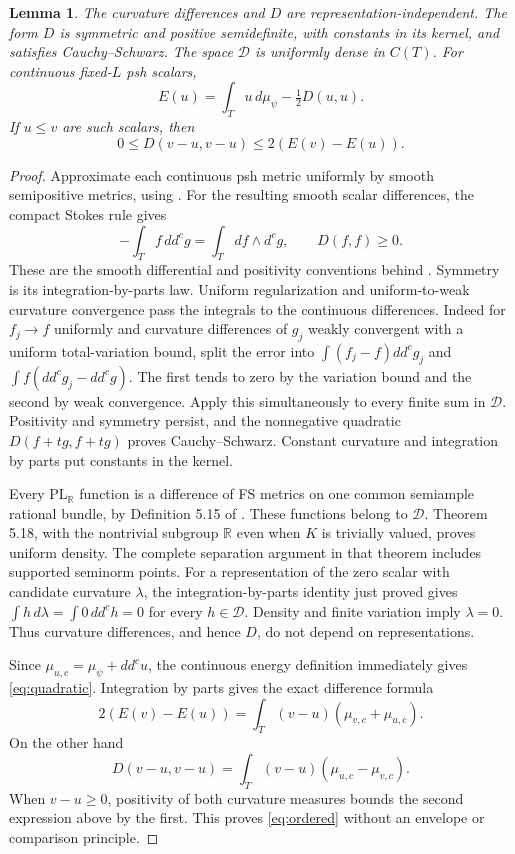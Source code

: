 \documentclass[11pt]{article}
\newtheorem{lemma}[theorem]{Lemma}
\newcommand{\ddc}{dd^c}
\newcommand{\DF}{\mathcal D}
\begin{document}
\begin{lemma}\label{lem:dirichlet}
The curvature differences and $D$ are representation-independent.
The form $D$ is symmetric and positive semidefinite, with constants
in its kernel, and satisfies Cauchy--Schwarz. The space $\DF$ is
uniformly dense in $C(T)$. For continuous fixed-$L$ psh scalars,
\begin{equation}\label{eq:quadratic}
 E(u)=\int_Tu\,d\mu_\psi-\tfrac12D(u,u).
\end{equation}
If $u\leq v$ are such scalars, then
\begin{equation}\label{eq:ordered}
 0\leq D(v-u,v-u)\leq 2(E(v)-E(u)).
\end{equation}
\end{lemma}
\begin{proof}
Approximate each continuous psh metric uniformly by smooth
semipositive metrics, using \cite[Theorem 7.14]{BE}. For the resulting
smooth scalar differences, the compact Stokes rule gives
\[
 -\int_T f\,\ddc g=\int_Tdf\wedge d^cg,
 \qquad D(f,f)\geq0.
\]
These are the smooth differential and positivity conventions behind
\cite[Proposition 8.3]{BE}. Symmetry is its integration-by-parts
law. Uniform regularization and uniform-to-weak curvature convergence
pass the integrals to the continuous differences. Indeed for
$f_j\to f$ uniformly and curvature differences of $g_j$ weakly
convergent with a uniform total-variation bound, split the error into
$\int(f_j-f)\ddc g_j$ and $\int f(\ddc g_j-\ddc g)$.
The first tends to zero by the variation bound and the second by
weak convergence. Apply this simultaneously to every finite sum in
$\DF$. Positivity and symmetry persist, and the nonnegative
quadratic $D(f+tg,f+tg)$ proves Cauchy--Schwarz. Constant curvature
and integration by parts put constants in the kernel.

Every $\mathrm{PL}_{\mathbb R}$ function is a difference of FS
metrics on one common semiample rational bundle, by Definition 5.15
of \cite{BE}. These functions belong to $\DF$. Theorem 5.18, with
the nontrivial subgroup $\mathbb R$ even when $K$ is trivially valued,
proves uniform density. The complete separation argument in that
theorem includes supported seminorm points. For a representation
of the zero scalar with candidate curvature $\lambda$, the
integration-by-parts identity just proved gives
$\int h\,d\lambda=\int 0\,\ddc h=0$ for every $h\in\DF$.
Density and finite variation imply $\lambda=0$. Thus curvature
differences, and hence $D$, do not depend on representations.

Since $\mu_{u,c}=\mu_\psi+\ddc u$, the continuous energy definition
immediately gives \eqref{eq:quadratic}. Integration by parts gives
the exact difference formula
\[
 2(E(v)-E(u))=\int_T(v-u)(\mu_{v,c}+\mu_{u,c}).
\]
On the other hand
\[
 D(v-u,v-u)=\int_T(v-u)(\mu_{u,c}-\mu_{v,c}).
\]
When $v-u\geq0$, positivity of both curvature measures bounds the
second expression above by the first. This proves
\eqref{eq:ordered} without an envelope or comparison principle.
\end{proof}
\end{document}
